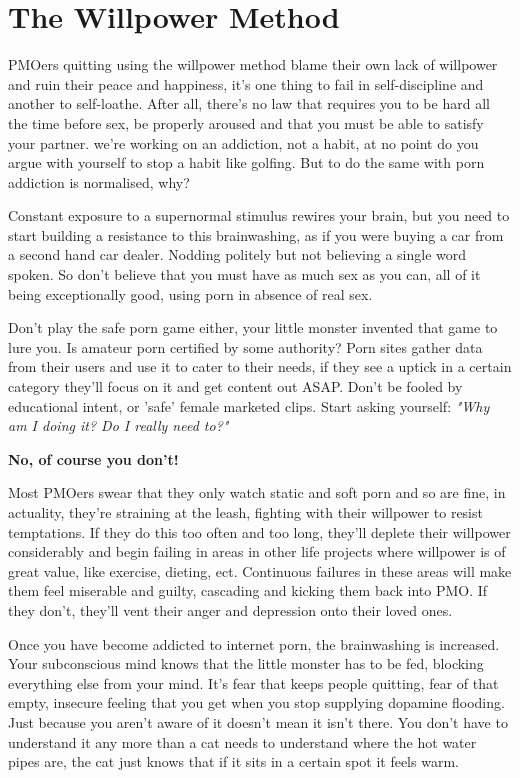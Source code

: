 \documentclass[easypeasy.tex]{subfiles}
\begin{document}
\section{The Willpower Method}
PMOers quitting using the willpower method blame their own lack of willpower and ruin their peace and happiness, it's one thing to fail in self-discipline and another to self-loathe. After all, there's no law that requires you to be hard all the time before sex, be properly aroused and that you must be able to satisfy your partner. we're working on an addiction, not a habit, at no point do you argue with yourself to stop a habit like golfing. But to do the same with porn addiction is normalised, why?

Constant exposure to a supernormal stimulus rewires your brain, but you need to start building a resistance to this brainwashing, as if you were buying a car from a second hand car dealer. Nodding politely but not believing a single word spoken. So don't believe that you must have as much sex as you can, all of it being exceptionally good, using porn in absence of real sex.

Don't play the safe porn game either, your little monster invented that game to lure you. Is amateur porn certified by some authority? Porn sites gather data from their users and use it to cater to their needs, if they see a uptick in a certain category they'll focus on it and get content out ASAP. Don't be fooled by educational intent, or 'safe' female marketed clips. Start asking yourself: \textit{"Why am I doing it? Do I really need to?"}

\textbf{No, of course you don't!}

Most PMOers swear that they only watch static and soft porn and so are fine, in actuality, they're straining at the leash, fighting with their willpower to resist temptations. If they do this too often and too long, they'll deplete their willpower considerably and begin failing in areas in other life projects where willpower is of great value, like exercise, dieting, ect. Continuous failures in these areas will make them feel miserable and guilty, cascading and kicking them back into PMO. If they don't, they'll vent their anger and depression onto their loved ones.

Once you have become addicted to internet porn, the brainwashing is increased. Your subconscious mind knows that the little monster has to be fed, blocking everything else from your mind. It's fear that keeps people quitting, fear of that empty, insecure feeling that you get when you stop supplying dopamine flooding. Just because you aren't aware of it doesn't mean it isn't there. You don't have to understand it any more than a cat needs to understand where the hot water pipes are, the cat just knows that if it sits in a certain spot it feels warm.
\end{document}
